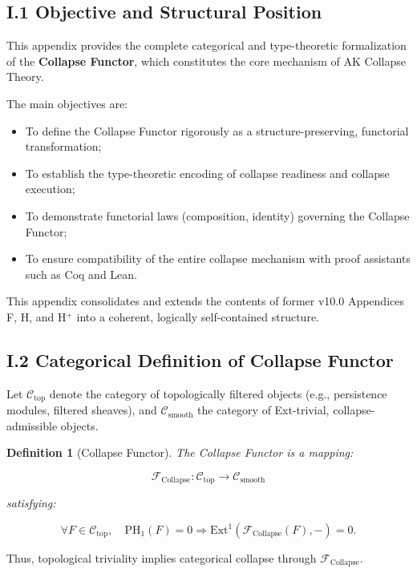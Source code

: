 \documentclass[11pt]{article}
\newtheorem{definition}[theorem]{Definition}
\begin{document}
\subsection*{I.1 Objective and Structural Position}

This appendix provides the complete categorical and type-theoretic formalization of the \textbf{Collapse Functor}, which constitutes the core mechanism of AK Collapse Theory.

The main objectives are:

\begin{itemize}
    \item To define the Collapse Functor rigorously as a structure-preserving, functorial transformation;
    \item To establish the type-theoretic encoding of collapse readiness and collapse execution;
    \item To demonstrate functorial laws (composition, identity) governing the Collapse Functor;
    \item To ensure compatibility of the entire collapse mechanism with proof assistants such as Coq and Lean.
\end{itemize}

This appendix consolidates and extends the contents of former v10.0 Appendices F, H, and H$^+$ into a coherent, logically self-contained structure.

\subsection*{I.2 Categorical Definition of Collapse Functor}

Let \( \mathcal{C}_{\mathrm{top}} \) denote the category of topologically filtered objects (e.g., persistence modules, filtered sheaves), and \( \mathcal{C}_{\mathrm{smooth}} \) the category of Ext-trivial, collapse-admissible objects.

\begin{definition}[Collapse Functor]
The \emph{Collapse Functor} is a mapping:

\[
\mathcal{F}_{\mathrm{Collapse}} : \mathcal{C}_{\mathrm{top}} \to \mathcal{C}_{\mathrm{smooth}}
\]

satisfying:

\[
\forall F \in \mathcal{C}_{\mathrm{top}}, \quad \mathrm{PH}_1(F) = 0 \Rightarrow \mathrm{Ext}^1(\mathcal{F}_{\mathrm{Collapse}}(F), -) = 0.
\]
\end{definition}

Thus, topological triviality implies categorical collapse through \( \mathcal{F}_{\mathrm{Collapse}} \).
\end{document}
